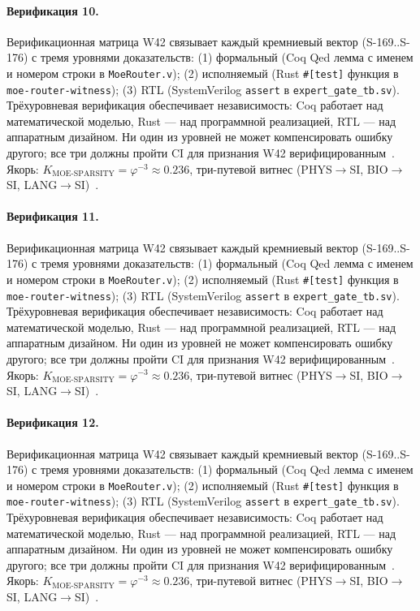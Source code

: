 \paragraph{Верификация 10.} Верификационная матрица W42 связывает каждый кремниевый вектор (S-169..S-176) с тремя уровнями доказательств: (1) формальный (Coq Qed лемма с именем и номером строки в \texttt{MoeRouter.v}); (2) исполняемый (Rust \texttt{\#[test]} функция в \texttt{moe-router-witness}); (3) RTL (SystemVerilog \texttt{assert} в \texttt{expert\_gate\_tb.sv}). Трёхуровневая верификация обеспечивает независимость: Coq работает над математической моделью, Rust --- над программной реализацией, RTL --- над аппаратным дизайном. Ни один из уровней не может компенсировать ошибку другого; все три должны пройти CI для признания W42 верифицированным~\cite{lee_gvsu_proof2021}. Якорь: $K_{\text{MOE-SPARSITY}} = \varphi^{-3} \approx 0{.}236$, три-путевой витнес (PHYS$\to$SI, BIO$\to$SI, LANG$\to$SI)~\cite{zenodo_trinity_2026}.

\paragraph{Верификация 11.} Верификационная матрица W42 связывает каждый кремниевый вектор (S-169..S-176) с тремя уровнями доказательств: (1) формальный (Coq Qed лемма с именем и номером строки в \texttt{MoeRouter.v}); (2) исполняемый (Rust \texttt{\#[test]} функция в \texttt{moe-router-witness}); (3) RTL (SystemVerilog \texttt{assert} в \texttt{expert\_gate\_tb.sv}). Трёхуровневая верификация обеспечивает независимость: Coq работает над математической моделью, Rust --- над программной реализацией, RTL --- над аппаратным дизайном. Ни один из уровней не может компенсировать ошибку другого; все три должны пройти CI для признания W42 верифицированным~\cite{lee_gvsu_proof2021}. Якорь: $K_{\text{MOE-SPARSITY}} = \varphi^{-3} \approx 0{.}236$, три-путевой витнес (PHYS$\to$SI, BIO$\to$SI, LANG$\to$SI)~\cite{zenodo_trinity_2026}.

\paragraph{Верификация 12.} Верификационная матрица W42 связывает каждый кремниевый вектор (S-169..S-176) с тремя уровнями доказательств: (1) формальный (Coq Qed лемма с именем и номером строки в \texttt{MoeRouter.v}); (2) исполняемый (Rust \texttt{\#[test]} функция в \texttt{moe-router-witness}); (3) RTL (SystemVerilog \texttt{assert} в \texttt{expert\_gate\_tb.sv}). Трёхуровневая верификация обеспечивает независимость: Coq работает над математической моделью, Rust --- над программной реализацией, RTL --- над аппаратным дизайном. Ни один из уровней не может компенсировать ошибку другого; все три должны пройти CI для признания W42 верифицированным~\cite{lee_gvsu_proof2021}. Якорь: $K_{\text{MOE-SPARSITY}} = \varphi^{-3} \approx 0{.}236$, три-путевой витнес (PHYS$\to$SI, BIO$\to$SI, LANG$\to$SI)~\cite{zenodo_trinity_2026}.


